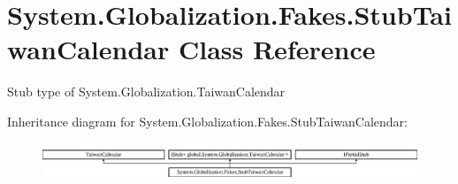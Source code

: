 \hypertarget{class_system_1_1_globalization_1_1_fakes_1_1_stub_taiwan_calendar}{\section{System.\-Globalization.\-Fakes.\-Stub\-Taiwan\-Calendar Class Reference}
\label{class_system_1_1_globalization_1_1_fakes_1_1_stub_taiwan_calendar}
}


Stub type of System.\-Globalization.\-Taiwan\-Calendar 


Inheritance diagram for System.\-Globalization.\-Fakes.\-Stub\-Taiwan\-Calendar\-:\begin{figure}[H]
\begin{center}
\leavevmode
\includegraphics[height=1.159420cm]{class_system_1_1_globalization_1_1_fakes_1_1_stub_taiwan_calendar}
\end{center}
\end{figure}
